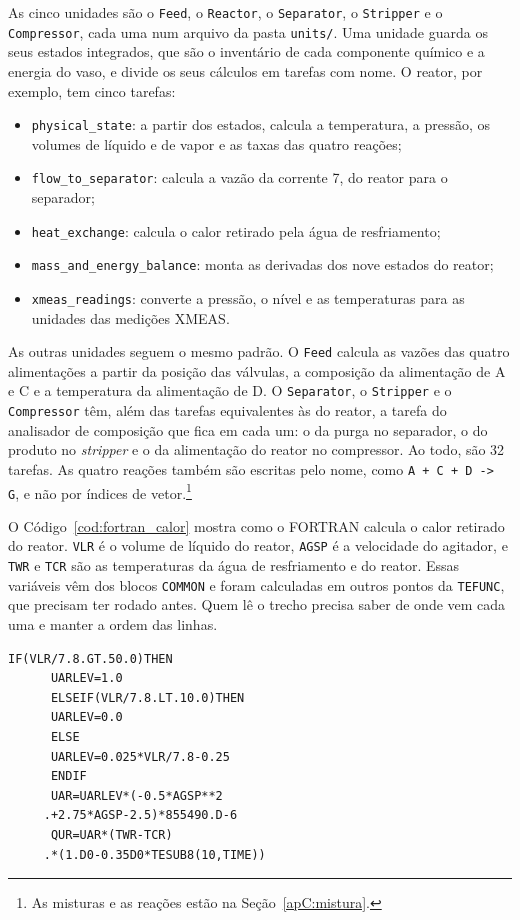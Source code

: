 As cinco unidades são o \texttt{Feed}, o \texttt{Reactor}, o \texttt{Separator}, o \texttt{Stripper} e o \texttt{Compressor}, cada uma num arquivo da pasta \texttt{units/}. Uma unidade guarda os seus estados integrados, que são o inventário de cada componente químico e a energia do vaso, e divide os seus cálculos em tarefas com nome. O reator, por exemplo, tem cinco tarefas:
\begin{itemize}
	\item \texttt{physical\_state}: a partir dos estados, calcula a temperatura, a pressão, os volumes de líquido e de vapor e as taxas das quatro reações;
	\item \texttt{flow\_to\_separator}: calcula a vazão da corrente 7, do reator para o separador;
	\item \texttt{heat\_exchange}: calcula o calor retirado pela água de resfriamento;
	\item \texttt{mass\_and\_energy\_balance}: monta as derivadas dos nove estados do reator;
	\item \texttt{xmeas\_readings}: converte a pressão, o nível e as temperaturas para as unidades das medições XMEAS.
\end{itemize}

As outras unidades seguem o mesmo padrão. O \texttt{Feed} calcula as vazões das quatro alimentações a partir da posição das válvulas, a composição da alimentação de A e C e a temperatura da alimentação de D. O \texttt{Separator}, o \texttt{Stripper} e o \texttt{Compressor} têm, além das tarefas equivalentes às do reator, a tarefa do analisador de composição que fica em cada um: o da purga no separador, o do produto no \textit{stripper} e o da alimentação do reator no compressor. Ao todo, são 32 tarefas. As quatro reações também são escritas pelo nome, como \texttt{A + C + D -> G}, e não por índices de vetor.\footnote{As misturas e as reações estão na Seção~\ref{apC:mistura}.}

O Código~\ref{cod:fortran_calor} mostra como o FORTRAN calcula o calor retirado do reator. \texttt{VLR} é o volume de líquido do reator, \texttt{AGSP} é a velocidade do agitador, e \texttt{TWR} e \texttt{TCR} são as temperaturas da água de resfriamento e do reator. Essas variáveis vêm dos blocos \texttt{COMMON} e foram calculadas em outros pontos da \texttt{TEFUNC}, que precisam ter rodado antes. Quem lê o trecho precisa saber de onde vem cada uma e manter a ordem das linhas.

\noindent\begin{minipage}{\linewidth}
\begin{lstlisting}[language={[77]Fortran}, caption={Calor retirado do reator no FORTRAN}, label={cod:fortran_calor}]
      IF(VLR/7.8.GT.50.0)THEN
      UARLEV=1.0
      ELSEIF(VLR/7.8.LT.10.0)THEN
      UARLEV=0.0
      ELSE
      UARLEV=0.025*VLR/7.8-0.25
      ENDIF
      UAR=UARLEV*(-0.5*AGSP**2
     .+2.75*AGSP-2.5)*855490.D-6
      QUR=UAR*(TWR-TCR)
     .*(1.D0-0.35D0*TESUB8(10,TIME))
\end{lstlisting}
\end{minipage}

